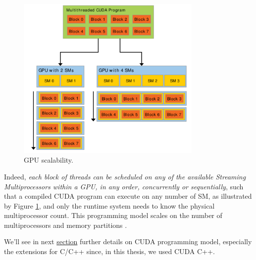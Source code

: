 	\begin{figure}[H]
		\centering
		\includegraphics[width=0.8\textwidth]{images/cudaSMs.png}
		\caption{GPU scalability.}
		\label{fig:cudaSM}
	\end{figure}
	Indeed, \textit{each block of threads can be scheduled on any of the available Streaming Multiprocessors within a GPU, in any order, concurrently or sequentially}, such that a compiled CUDA program can execute on any number of SM, as illustrated by Figure \ref{fig:cudaSM}, and only the runtime system needs to know the physical multiprocessor count.
	This programming model scales on the number of multiprocessors and memory partitions \cite{cudaguide}. 
	
	We'll see in next \hyperref[sect:CUDAcpp]{section} further details on CUDA programming model, especially the extensions for C/C++ since, in this thesis, we used CUDA C++.
	
